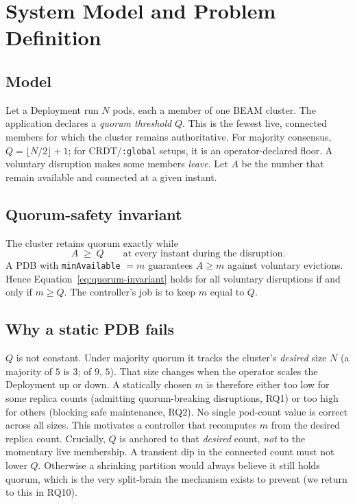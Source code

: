 \documentclass[AMA,Times1COL]{WileyNJDv5}
\begin{document}
\section{System Model and Problem Definition}\label{sec:model}

\subsection{Model}\label{sec:model-model}
Let a Deployment run $N$ pods, each a member of one BEAM cluster. The application declares a
\emph{quorum threshold} $Q$. This is the fewest live, connected members for which the cluster remains
authoritative. For majority consensus, $Q=\lfloor N/2\rfloor+1$; for CRDT/\texttt{:global} setups, it is
an operator-declared floor. A voluntary disruption makes some members \emph{leave}. Let $A$ be the number
that remain available and connected at a given instant.

\subsection{Quorum-safety invariant}\label{sec:model-invariant}
The cluster retains quorum exactly while
\begin{equation}\label{eq:quorum-invariant}
  A \;\ge\; Q \qquad\text{at every instant during the disruption.}
\end{equation}
A PDB with \texttt{minAvailable} $=m$ guarantees $A\ge m$ against voluntary evictions. Hence
Equation~\eqref{eq:quorum-invariant} holds for all voluntary disruptions if and only if $m\ge Q$. The
controller's job is to keep $m$ equal to $Q$.

\subsection{Why a static PDB fails}\label{sec:model-constant}
$Q$ is not constant. Under majority quorum it tracks the cluster's \emph{desired} size $N$ (a majority of
$5$ is $3$; of $9$, $5$). That size changes when the operator scales the Deployment up or down. A
statically chosen $m$ is therefore either too low for some replica counts (admitting quorum-breaking
disruptions, RQ1) or too high for others (blocking safe maintenance, RQ2). No single pod-count value is
correct across all sizes. This motivates a controller that recomputes $m$ from the desired replica count.
Crucially, $Q$ is anchored to that \emph{desired} count, \emph{not} to the momentary live membership. A
transient dip in the connected count must not lower $Q$. Otherwise a shrinking partition would always
believe it still holds quorum, which is the very split-brain the mechanism exists to prevent (we return
to this in RQ10).
\end{document}
